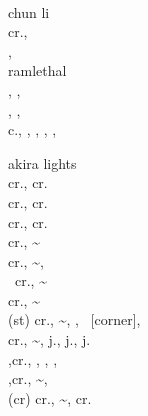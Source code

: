 \documentclass[a4paper,9pt,twocolumn]{letter}
\begin{document}
\sffamily

\noindent
\anypunch\lpunch\mpunch\hpunch\allpunch\expunch \\
\anykick\lkick\mkick\hkick\allkick\exkick \\
\vsone\vstwo\vtone\vttwo \\
\cancel\crush\air\mash \\
\btnp\btnk\btns\btnhs\btnd\bluerc\purplerc\yellowrc\redrc \\
\btnl\btnm\btnh\btnsp \\

\noindent
chun li \\
cr.\hpunch, \holddown\up\exkick \\
\back\hpunch, \hcdf\anypunch \\

\noindent
ramlethal \\
\down\btnk, \down\btnd, \dragonpunch\btnp \\
\down\btnk, \down\btnd, \qcb\btnp\qcb\btnp\qcb\btnp \\
c.\btns, \down\btnhs, \dragonpunch\btnp, \btnk, \forward\btnhs, \qcb\btnk

\smallbreak
\noindent
akira lights \\
cr.\lkick, cr.\lpunch\cancel\qcb\lpunch \\
cr.\lkick, cr.\lpunch\cancel\dragonpunch\hkick \\
cr.\lkick, cr.\lpunch\cancel\qcb\expunch \\
cr.\lpunch, \lpunch\~\mpunch\cancel\dragonpunch\hkick \\
cr.\lpunch, \lpunch\~\mpunch\cancel\qcb\mkick,\lkick \\\
cr.\lpunch, \lpunch\~\mpunch\cancel\qcb\hpunch \\
cr.\lpunch, \lpunch\~\mpunch\cancel\vstwo \\
(st) cr.\lpunch, \lpunch\~\mpunch\cancel\qcb\hkick, \hkick, \qcb\expunch\ [corner], \dragonpunch\exkick \\
cr.\lpunch, \lpunch\~\mpunch\cancel\vstwo\cancel\up, j.\lpunch, j.\mpunch, j. \\
\vsone,cr.\lpunch, \lpunch\mkick\cancel\qcb\hkick, \hkick, \qcf\expunch, \qcf\hpunch \\
\vsone,cr.\lpunch, \lpunch\~\mpunch\cancel\qcf\expunch, \dragonpunch\hkick \\
(cr) cr.\lpunch, \lpunch\~\mpunch\cancel\qcb\mpunch, cr.\lpunch\cancel\dragonpunch\hkick \\
\end{document}
